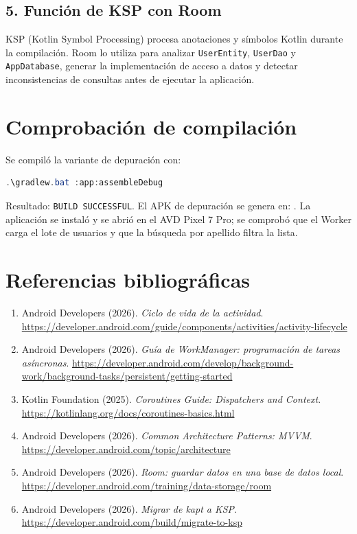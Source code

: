\documentclass[12pt,a4paper,oneside]{report}
\begin{document}
\section*{5. Función de KSP con Room}
KSP (Kotlin Symbol Processing) procesa anotaciones y símbolos Kotlin durante la
compilación. Room lo utiliza para analizar \texttt{UserEntity}, \texttt{UserDao} y
\texttt{AppDatabase}, generar la implementación de acceso a datos y detectar
inconsistencias de consultas antes de ejecutar la aplicación.

\chapter{Comprobación de compilación}
Se compiló la variante de depuración con:
\begin{lstlisting}[language=Java]
.\gradlew.bat :app:assembleDebug
\end{lstlisting}

Resultado: \texttt{BUILD SUCCESSFUL}. El APK de depuración se genera en:
.
La aplicación se instaló y se abrió en el AVD Pixel 7 Pro; se comprobó que el
Worker carga el lote de usuarios y que la búsqueda por apellido filtra la lista.

\chapter{Referencias bibliográficas}
\begingroup\sloppy
\begin{enumerate}
  \item Android Developers (2026). \textit{Ciclo de vida de la actividad}.
  \url{https://developer.android.com/guide/components/activities/activity-lifecycle}
  \item Android Developers (2026). \textit{Guía de WorkManager: programación de tareas asíncronas}.
  \url{https://developer.android.com/develop/background-work/background-tasks/persistent/getting-started}
  \item Kotlin Foundation (2025). \textit{Coroutines Guide: Dispatchers and Context}.
  \url{https://kotlinlang.org/docs/coroutines-basics.html}
  \item Android Developers (2026). \textit{Common Architecture Patterns: MVVM}.
  \url{https://developer.android.com/topic/architecture}
  \item Android Developers (2026). \textit{Room: guardar datos en una base de datos local}.
  \url{https://developer.android.com/training/data-storage/room}
  \item Android Developers (2026). \textit{Migrar de kapt a KSP}.
  \url{https://developer.android.com/build/migrate-to-ksp}
\end{enumerate}
\endgroup
\end{document}

